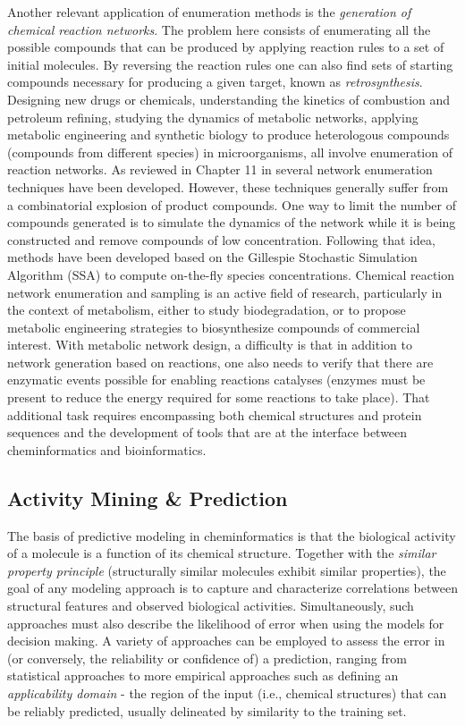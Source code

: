 \documentclass{sig-alternate}
\begin{document}
Another relevant application of enumeration methods is the
\emph{generation of chemical reaction networks}. The problem here
consists of enumerating all the possible compounds that can be
produced by applying reaction rules to a set of initial molecules. By
reversing the reaction rules one can also find sets of starting
compounds necessary for producing a given target, known as
\emph{retrosynthesis}. Designing new drugs or chemicals, understanding
the kinetics of combustion and petroleum refining, studying the
dynamics of metabolic networks, applying metabolic engineering and
synthetic biology to produce heterologous compounds (compounds from
different species) in microorganisms, all involve enumeration of
reaction networks. As reviewed in Chapter 11 in \cite{faulon2010}
several network enumeration techniques have been developed. However,
these techniques generally suffer from a combinatorial explosion of
product compounds. One way to limit the number of compounds generated
is to simulate the dynamics of the network while it is being
constructed and remove compounds of low concentration. Following that
idea, methods have been developed based on the Gillespie Stochastic
Simulation Algorithm (SSA) to compute on-the-fly species
concentrations. Chemical reaction network enumeration and sampling is
an active field of research, particularly in the context of
metabolism, either to study biodegradation, or to propose metabolic
engineering strategies to biosynthesize compounds of commercial
interest. With metabolic network design, a difficulty is that in
addition to network generation based on reactions, one also needs to
verify that there are enzymatic events possible for enabling reactions
catalyses (enzymes must be present to reduce the
energy required for some reactions to take place). That additional
task requires encompassing both chemical structures and protein
sequences and the development of tools that are at the
interface between cheminformatics and bioinformatics.

\subsection{Activity Mining \& Prediction}
\label{sec:activity-mining}


The basis of predictive modeling in cheminformatics is that the
biological activity of a molecule is a function of its chemical
structure. Together with the \emph{similar property principle}
\cite{Johnson:1990qf} (structurally similar molecules exhibit
similar properties), the goal of any modeling approach is to capture
and characterize correlations between structural features and
observed biological activities. Simultaneously, such approaches must
also describe the likelihood of error when using the
models for decision making.  A variety of approaches can be employed
to assess the error in (or conversely, the reliability or confidence of) a
prediction, ranging from statistical approaches to more
empirical approaches such as defining an \emph{applicability domain} -
the region of the input (i.e., chemical structures) that can be
reliably predicted, usually delineated by similarity
to the training set.
\end{document}
